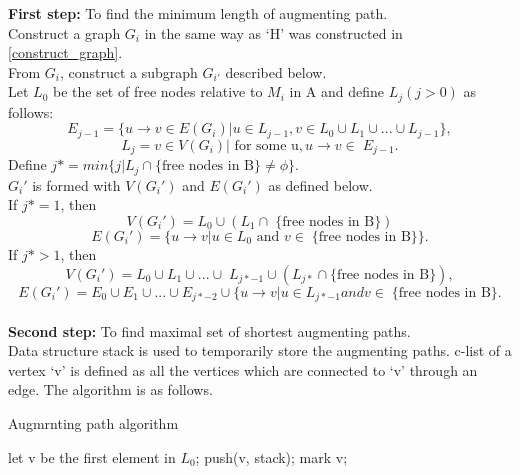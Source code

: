 \documentclass[a4paper]{report}
\theoremstyle{definition}
\begin{document}
\textbf{First step:} To find the minimum length of augmenting path.\\
Construct a graph $G_i$ in the same way as `H' was constructed in \ref{construct_graph}.\\
From $G_i$, construct a subgraph $G_{i'}$ described below.\\
Let $L_0$ be the set of free nodes relative to $M_i$ in A and define $L_j (j > 0)$ as follows:
$$E_{j-1} = \{u \rightarrow v \in E(G_i) | u \in L_{j-1}, v \in L_0 \cup L_1 \cup ... \cup L_{j-1}\},$$
$$L_j = {v \in V(G_i) |\mbox{ for some u}, u \rightarrow v \inE_{j-1}}.$$
Define $j* = min\{j | L_j \cap \{\mbox{free nodes in B}\} \neq \phi\}.$\\
$G_i'$ is formed with $V(G_i')$ and $E(G_i')$ as defined below.\\ \newline
If $j* = 1$, then 
	$$V(G_i') = L_0 \cup (L_1 \cap\mbox{\{free nodes in B\}})$$
	$$E(G_i') = \{u \rightarrow v | u \in L_0 \mbox{ and } v \in\{\mbox{free nodes in B}\}\}.$$
If $j* > 1$, then
	$$V(G_i') = L_0 \cup L_1 \cup ... \cupL_{j*-1} \cup (L_{j*} \cap \{\mbox{free nodes in 	B}\}),$$
	$$E(G_i') = E_0 \cup E_1 \cup ... \cup E_{j*-2} \cup \{u \rightarrow v | u \in L_{j*-1} and 	v \in\{\mbox{free nodes in B}\}.$$\\
\textbf{Second step:} To find maximal set of shortest augmenting paths.\\
Data structure stack is used to temporarily store the augmenting paths. c-list of a vertex `v' is defined as all the vertices which are connected to `v' through an edge. The algorithm is as follows.\\ 

\begin{algorithm}[H]
\caption{Augmrnting path algorithm}
let v be the first element in $L_0$;
push(v, stack); mark v;\\
\end{algorithm}
\end{document}
